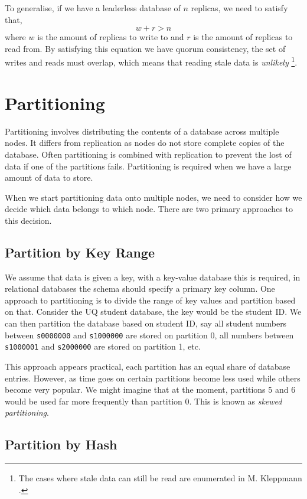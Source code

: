 To generalise, if we have a leaderless database of $n$ replicas,
we need to satisfy that,
$$
w + r > n
$$
where $w$ is the amount of replicas to write to and $r$ is the amount of replicas to read from.
By satisfying this equation we have quorum consistency,
the set of writes and reads must overlap,
which means that reading stale data is \textsl{unlikely}%
\footnote{The cases where stale data can still be read are enumerated in M. Kleppmann \cite{data-intensive}.}.

\section{Partitioning}

Partitioning involves distributing the contents of a database across multiple nodes.
It differs from replication as nodes do not store complete copies of the database.
Often partitioning is combined with replication to prevent the lost of data if one of the partitions fails.
Partitioning is required when we have a large amount of data to store.

When we start partitioning data onto multiple nodes,
we need to consider how we decide which data belongs to which node.
There are two primary approaches to this decision.

\subsection*{Partition by Key Range}
We assume that data is given a key,
with a key-value database this is required,
in relational databases the schema should specify a primary key column.
One approach to partitioning is to divide the range of key values and partition based on that.
Consider the UQ student database,
the key would be the student ID.
We can then partition the database based on student ID,
say all student numbers between \texttt{s0000000} and \texttt{s1000000} are stored on partition 0,
all numbers between \texttt{s1000001} and \texttt{s2000000} are stored on partition 1, etc.

This approach appears practical,
each partition has an equal share of database entries.
However, as time goes on certain partitions become less used while others become very popular.
We might imagine that at the moment,
partitions 5 and 6 would be used far more frequently than partition 0.
This is known as \textsl{skewed partitioning}.

\subsection*{Partition by Hash}

